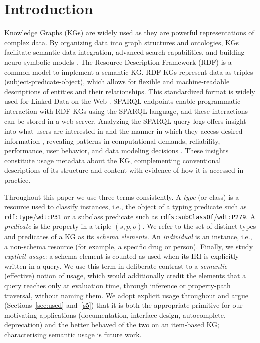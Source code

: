 \documentclass[sw]{iosart2x}
\begin{document}

\section{ Introduction }\label{s1}



Knowledge Graphs (KGs) are widely used as they are powerful representations of complex data. By organizing data into graph structures and ontologies, KGs facilitate semantic data integration, advanced search capabilities, and building neuro-symbolic  models \cite{abu2021domain,peng2023knowledge}. The Resource Description Framework (RDF) is a common model to implement a semantic KG. RDF KGs represent data as triples (subject-predicate-object), which allows for flexible and machine-readable descriptions of entities and their relationships. This standardized format is widely used for Linked Data on the Web \cite{ali2022survey}. SPARQL endpoints enable programmatic interaction with RDF KGs using the SPARQL language, and these interactions can be stored in a web server. Analyzing the SPARQL query logs offers insight into what users are interested in and the manner in which they access desired information \cite{bielefeldt2018practical}, revealing patterns in computational demands, reliability, performance, user behavior, and data modeling decisions \cite{asprino2023your, mohammadi2022semi, Handschuh2010LearningFL,bonifati2017analytical,kaminski2018complexity, picalausa2011real,lorey2013detecting, raghuveer2012characterizing,rietveld2014man}. These insights constitute usage metadata about the KG, complementing conventional descriptions of its structure and content with evidence of how it is accessed in practice.


Throughout this paper we use three terms consistently. A \emph{type} (or class) is a resource used to classify instances, i.e., the object of a typing predicate such as \texttt{rdf:type}/\texttt{wdt:P31} or a subclass predicate such as \texttt{rdfs:subClassOf}/\texttt{wdt:P279}. A \emph{predicate} is the property in a triple $(s,p,o)$. We refer to the set of distinct types and predicates of a KG as its \emph{schema elements}. An \emph{individual} is an instance, i.e., a non-schema resource (for example, a specific drug or person). Finally, we study \emph{explicit usage}: a schema element is counted as used when its IRI is explicitly written in a query. We use this term in deliberate contrast to a \emph{semantic} (effective) notion of usage, which would additionally credit the elements that a query reaches only at evaluation time, through inference or property-path traversal, without naming them. We adopt explicit usage throughout and argue (Sections~\ref{sec:used} and~\ref{s5}) that it is both the appropriate primitive for our motivating applications (documentation, interface design, autocomplete, deprecation) and the better behaved of the two on an item-based KG; characterising semantic usage is future work.
\end{document}
